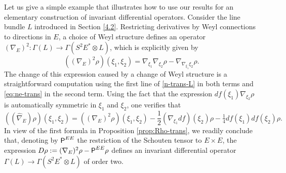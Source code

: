 \documentclass[11pt]{amsart}
\def\Rho{\mbox{\textsf{P}}}
\numberwithin{proposition}{section}
\numberwithin{equation}{section}
\begin{document}
Let us give a simple example that illustrates how to use our results for an elementary construction of invariant differential operators. Consider the line bundle $L$ introduced in Section \ref{4.2}. Restricting derivatives by Weyl connections to directions in $E$, a choice of Weyl structure defines an operator $(\nabla_E)^2:\Gamma(L)\to\Gamma(S^2E^*\otimes L)$, which is explicitly given by 
$$
((\nabla_E)^2\rho)(\xi_1,\xi_2)=\nabla_{\xi_1}\nabla_{\xi_2}\rho-\nabla_{\nabla_{\xi_1}\xi_2}\rho.
$$  
The change of this expression caused by a change of Weyl structure is a straightforward computation using the first line of \eqref{n-trans-L} in both terms and \eqref{eq:ne-trans} in the second term. Using the fact that the expression $df(\xi_1)\nabla_{\xi_2}\rho$ is automatically symmetric in $\xi_1$ and $\xi_2$, one verifies that $$((\hat\nabla_E)\rho)(\xi_1,\xi_2)=((\nabla_E)^2\rho)(\xi_1,\xi_2)-\frac12(\nabla_{\xi_1}df)(\xi_2)\rho-\tfrac14 df(\xi_1)df(\xi_2)\rho.
$$
In view of the first formula in Proposition \ref{prop:Rho-trans}, we readily conclude that, denoting by $\Rho^{EE}$ the restriction of the Schouten tensor to $E\times E$, the expression $D\rho:=(\nabla_E)^2\rho-\Rho^{EE}\rho$ defines an invariant differential operator $\Gamma(L)\to\Gamma(S^2E^*\otimes L)$ of order two. 
\end{document}
